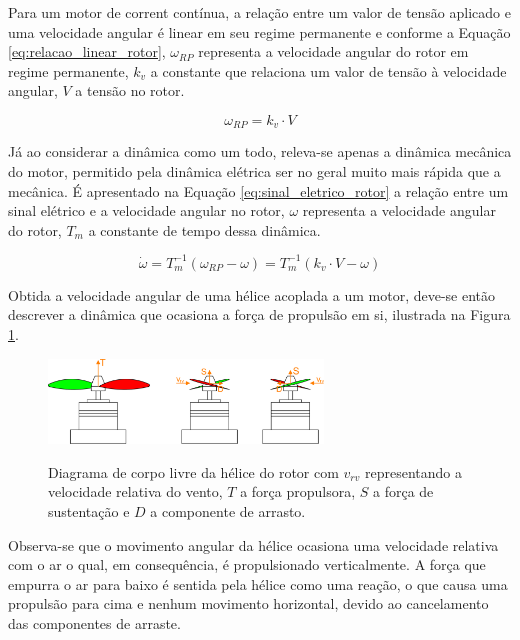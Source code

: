 \documentclass[main.tex]{subfiles}
\begin{document}
Para um motor de corrent contínua, a relação entre um valor de tensão aplicado e uma velocidade angular é linear em seu regime permanente e conforme a Equação \ref{eq:relacao_linear_rotor}, $\omega_{RP}$ representa a velocidade angular do rotor em regime permanente, $k_v$ a constante que relaciona um valor de tensão à velocidade angular, $V$ a tensão no rotor.

\begin{equation}\label{eq:relacao_linear_rotor}
	\omega_{RP} = k_v \cdot V
\end{equation}

Já ao considerar a dinâmica como um todo, releva-se apenas a dinâmica mecânica do motor, permitido pela dinâmica elétrica ser no geral muito mais rápida que a mecânica. É apresentado na Equação \ref{eq:sinal_eletrico_rotor} a relação entre um sinal elétrico e a velocidade angular no rotor, $\omega$ representa a velocidade angular do rotor, $T_m$ a constante de tempo dessa dinâmica.

\begin{equation}\label{eq:sinal_eletrico_rotor}
	\dot{\omega} = T_m^{-1}(\omega_{RP} - \omega) = T_m^{-1}(k_v \cdot V - \omega)
\end{equation}

Obtida a velocidade angular de uma hélice acoplada a um motor, deve-se então descrever a dinâmica que ocasiona a força de propulsão em si, ilustrada na Figura \ref{fig:lift_forces}.


\begin{figure}[!h]
	\centering
	\caption{Diagrama de corpo livre da hélice do rotor com $v_{rv}$ representando a velocidade relativa do vento, $T$ a força propulsora, $S$ a força de sustentação e $D$ a componente de arrasto.}
	\includegraphics[width=0.65\textwidth]{capitulos/modelagem/imgs/lift_forces.png}
	\label{fig:lift_forces}
\end{figure}

Observa-se que o movimento angular da hélice ocasiona uma velocidade relativa com o ar o qual, em consequência, é propulsionado verticalmente. A força que empurra o ar para baixo é sentida pela hélice como uma reação, o que causa uma propulsão para cima e nenhum movimento horizontal, devido ao cancelamento das componentes de arraste. 
\end{document}
